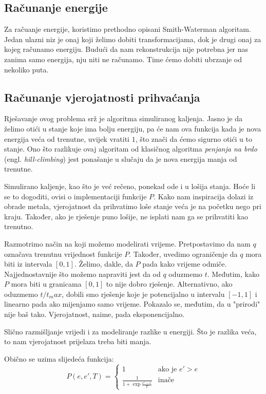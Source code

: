 \documentclass[times, utf8, zavrsni]{fer}
\begin{document}
\subsection{Računanje energije}
Za račuanje energije, koristimo prethodno opisani Smith-Waterman algoritam. 
Jedan ulazni niz je onaj koji želimo dobiti transformacijama, dok je drugi
onaj za kojeg računamo energiju. 
Budući da nam rekonstrukcija nije potrebna jer nas zanima samo energija,
nju niti ne računamo. Time ćemo dobiti ubrzanje od nekoliko puta.


\subsection{Računanje vjerojatnosti prihvaćanja}
Rješavanje ovog problema srž je algoritma simuliranog kaljenja. 
Jasno je da želimo otići u stanje koje ima bolju energiju, pa
će nam ova funkcija kada je nova energija veća od trenutne, uvijek
vratiti $1$, što znači da ćemo sigurno otići u to stanje. 
Ono što razlikuje ovaj algoritam od klasičnog algoritma
\textit{penjanja na brdo} (engl. \textit{hill-climbing}) jest 
ponašanje u slučaju da je nova energija manja od trenutne. 

Simulirano kaljenje, kao što je već rečeno, ponekad ode i u lošija
stanja. Hoće li se to dogoditi, ovisi o implementaciji funkcije
$P$. Kako nam inspiracija dolazi iz obrade metala, vjerojatnost da
prihvatimo loše stanje veća je na početku nego pri kraju. Također,
ako je rješenje puno lošije, ne isplati nam ga se prihvatiti kao
trenutno. 

Razmotrimo način na koji možemo modelirati vrijeme. Pretpostavimo
da nam $q$ označava trenutnu vrijednost funkcije $P$. Također,
uvedimo ograničenje da $q$ mora biti iz intervala $[0, 1]$.
Želimo, dakle, da $P$ pada kako vrijeme odmiče. Najjednostavnije
što možemo napraviti jest da od $q$ oduzmemo $t$. Međutim,
kako $P$ mora biti u granicama $[0, 1]$ to nije dobro rješenje.
Alternativno, ako oduzmemo $t/t_max$, dobili smo rješenje koje
je potencijalno u intervalu $[-1, 1]$ i linearno pada
ako mijenjamo samo vrijeme. Pokazalo se, međutim, da u "prirodi"
nije baš tako. Vjerojatnost, naime, pada eksponencijalno. 

Slično razmišljanje vrijedi i za modeliranje razlike u energiji.
Što je razlika veća, to nam vjerojatnost prijelaza treba biti manja.

Obično se uzima slijedeća funkcija: 
$$
P(e, e', T) = 
\left\{ \begin{array}{ll}
	1 & \mbox{ako je } e' > e \\
	\frac{1}{1+\exp \frac{e'-e}{T}} & \mbox{inače}
\end{array} \right.
$$
\end{document}

